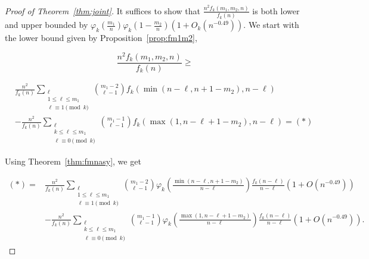 \documentclass{amsart}
\theoremstyle{definition}
\begin{document}
\begin{proof}[Proof of Theorem~\ref{thm:joint}] It suffices to show that $\frac{n^2 f_k(m_1,m_2,n)}{f_k(n)}$ is both lower and upper bounded by $\varphi_k\left(\frac{m_1}{n}\right)\varphi_k\left(1-\frac{m_2}{n}\right)\left(1+O_k\left(n^{-0.49}\right)\right)$. We start with the lower bound given by Proposition~\ref{prop:fm1m2},


\[\frac{n^2f_k(m_1,m_2,n)}{f_k(n)}\geq \]

\begin{align*}
    &\frac{n^2}{f_k(n)}\sum_{\substack{\ell\\1\leq \ell \leq m_1\\ \ell\equiv 1 \pmod{k}}}\binom{m_1-2}{\ell-1}f_k\left(\min(n-\ell,n+1-m_2),n-\ell\right)\\
    &-\frac{n^2}{f_k(n)}\sum_{\substack{\ell\\k\leq \ell \leq m_1\\ \ell\equiv 0 \pmod{k}}}   \binom{m_1-1}{\ell-1}f_k\left(\max(1,n-\ell+1-m_2),n-\ell\right)=(*)
\end{align*}

Using Theorem~\ref{thm:fmnasy}, we get

\begin{align*}
    (*)=&\frac{n^2}{f_k(n)}\sum_{\substack{\ell\\1\leq \ell \leq m_1\\ \ell\equiv 1 \pmod{k}}}\binom{m_1-2}{\ell-1}\varphi_k\left(\frac{\min(n-\ell,n+1-m_2)}{n-\ell}\right)\frac{f_k(n-\ell)}{n-\ell}\left(1+O\left(n^{-0.49}\right)\right)\\ &-\frac{n^2}{f_k(n)}\sum_{\substack{\ell\\k\leq \ell \leq m_1\\ \ell\equiv 0 \pmod{k}}}   \binom{m_1-1}{\ell-1}\varphi_k\left(\frac{\max(1,n-\ell+1-m_2)}{n-\ell}\right)\frac{f_k(n-\ell)}{n-\ell}\left(1+O\left(n^{-0.49}\right)\right).
\end{align*}


\end{proof}
\end{document}

